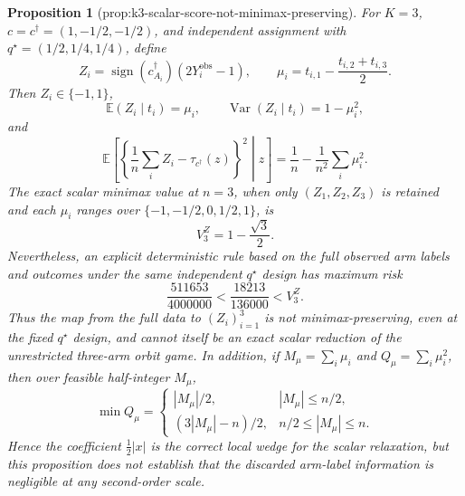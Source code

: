 \documentclass{article}
\newtheorem{proposition}{Proposition}
\begin{document}
\begin{proposition}[prop:k3-scalar-score-not-minimax-preserving]\label{prop:k3-scalar-score-not-minimax-preserving}
For \(K=3\), \(c=c^\dagger=(1,-1/2,-1/2)\), and independent assignment with \(q^\star=(1/2,1/4,1/4)\), define
\[
 Z_i=\operatorname{sign}(c_{A_i}^\dagger)(2Y_i^{\mathrm{obs}}-1),
 \qquad
 \mu_i=t_{i,1}-\frac{t_{i,2}+t_{i,3}}{2}.
\]
Then \(Z_i\in\{-1,1\}\),
\[
 \mathbb E(Z_i\mid t_i)=\mu_i,
 \qquad
 \operatorname{Var}(Z_i\mid t_i)=1-\mu_i^2,
\]
and
\[
 \mathbb E\!\left[\left\{\frac1n\sum_iZ_i-\tau_{c^\dagger}(z)\right\}^2\middle|z\right]
 =\frac1n-\frac1{n^2}\sum_i\mu_i^2.
\]
The exact scalar minimax value at \(n=3\), when only \((Z_1,Z_2,Z_3)\) is retained and each \(\mu_i\) ranges over \(\{-1,-1/2,0,1/2,1\}\), is
\[
 V_3^Z=1-\frac{\sqrt3}{2}.
\]
Nevertheless, an explicit deterministic rule based on the full observed arm labels and outcomes under the same independent \(q^\star\) design has maximum risk
\[
 \frac{511653}{4000000}<\frac{18213}{136000}<V_3^Z.
\]
Thus the map from the full data to \((Z_i)_{i=1}^3\) is not minimax-preserving, even at the fixed \(q^\star\) design, and cannot itself be an exact scalar reduction of the unrestricted three-arm orbit game.  In addition, if \(M_\mu=\sum_i\mu_i\) and \(Q_\mu=\sum_i\mu_i^2\), then over feasible half-integer \(M_\mu\),
\[
 \min Q_\mu=
 \begin{cases}
 |M_\mu|/2,&|M_\mu|\leq n/2,\\
 (3|M_\mu|-n)/2,&n/2\leq|M_\mu|\leq n.
 \end{cases}
\]
Hence the coefficient \(\tfrac12|x|\) is the correct local wedge for the scalar relaxation, but this proposition does not establish that the discarded arm-label information is negligible at any second-order scale.
\end{proposition}
\end{document}
